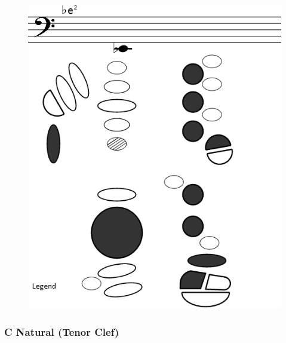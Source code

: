 \documentclass[12pt,english]{article}
\begin{document}
\begin{figure}[H]
\caption{}


\begin{centering}
\includegraphics[scale=0.6]{fingering4}
\par\end{centering}

\end{figure}



\subsubsection{C Natural (Tenor Clef)}
\end{document}
